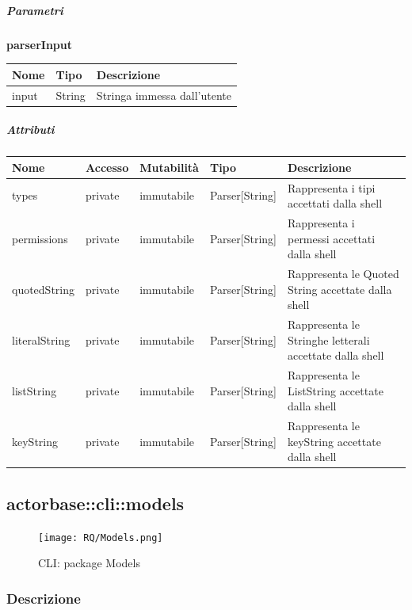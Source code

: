 \documentclass{scalatekids-article}
\begin{document}
\subparagraph{Parametri}

\begin{center}
  \textbf{parserInput}
\end{center}
\begin{tabular}{| p{3cm} | p{3.5cm} | p{8.5cm} |}
  \hline
  Nome & Tipo & Descrizione\\
  \hline
  input & String & Stringa immessa dall'utente\\
  \hline
\end{tabular}

\subparagraph{Attributi}

\begin{tabular}{| p{2.5cm} | p{1.5cm} | p{2cm} | p{2.5cm} | p{8.5cm} |}
  \hline
  Nome & Accesso & Mutabilità & Tipo & Descrizione\\
  \hline
  types & private & immutabile & Parser[String] & Rappresenta i tipi accettati dalla shell\\
  \hline
  permissions & private & immutabile & Parser[String] & Rappresenta i permessi accettati dalla shell\\
  \hline
  quotedString & private & immutabile & Parser[String] & Rappresenta le Quoted String accettate dalla shell\\
  \hline
  literalString & private & immutabile & Parser[String] & Rappresenta le Stringhe letterali accettate dalla shell\\
  \hline
  listString & private & immutabile & Parser[String] & Rappresenta le ListString accettate dalla shell\\
  \hline
  keyString & private & immutabile & Parser[String] & Rappresenta le keyString accettate dalla shell\\
  \hline
\end{tabular}

\subsection{actorbase::cli::models}
\label{sec:actorbase::cli::models}

\begin{figure}[H]
  \begin{center}
    \texttt{[image: RQ/Models.png]}
    \caption{CLI: package Models}
  \end{center}
\end{figure}

\subsubsection{Descrizione}
\end{document}
